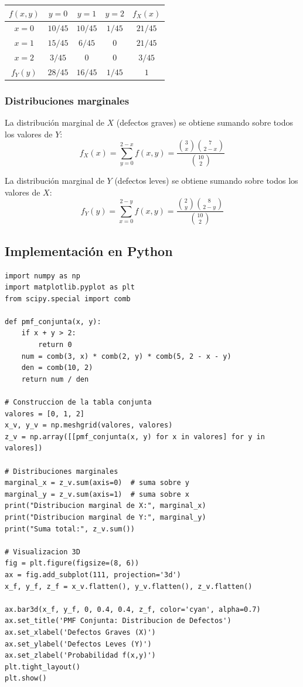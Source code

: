 \documentclass[12pt,a4paper]{article}
\begin{document}
\begin{center}
\renewcommand{\arraystretch}{1.4}
\begin{tabular}{c|ccc|c}
\toprule
$f(x,y)$ & $y=0$ & $y=1$ & $y=2$ & $f_X(x)$ \\
\midrule
$x=0$ & $10/45$ & $10/45$ & $1/45$ & $21/45$ \\
$x=1$ & $15/45$ & $6/45$  & $0$    & $21/45$ \\
$x=2$ & $3/45$  & $0$     & $0$    & $3/45$  \\
\midrule
$f_Y(y)$ & $28/45$ & $16/45$ & $1/45$ & $1$ \\
\bottomrule
\end{tabular}
\end{center}
 
\subsubsection*{Distribuciones marginales}
 
La distribución marginal de $X$ (defectos graves) se obtiene sumando sobre todos los valores de $Y$:
\[
f_X(x) = \sum_{y=0}^{2-x} f(x,y) = \frac{\binom{3}{x}\binom{7}{2-x}}{\binom{10}{2}}
\]
 
La distribución marginal de $Y$ (defectos leves) se obtiene sumando sobre todos los valores de $X$:
\[
f_Y(y) = \sum_{x=0}^{2-y} f(x,y) = \frac{\binom{2}{y}\binom{8}{2-y}}{\binom{10}{2}}
\]
 
\subsection{Implementación en Python}
 
\begin{lstlisting}
import numpy as np
import matplotlib.pyplot as plt
from scipy.special import comb
 
def pmf_conjunta(x, y):
    if x + y > 2:
        return 0
    num = comb(3, x) * comb(2, y) * comb(5, 2 - x - y)
    den = comb(10, 2)
    return num / den
 
# Construccion de la tabla conjunta
valores = [0, 1, 2]
x_v, y_v = np.meshgrid(valores, valores)
z_v = np.array([[pmf_conjunta(x, y) for x in valores] for y in valores])
 
# Distribuciones marginales
marginal_x = z_v.sum(axis=0)  # suma sobre y
marginal_y = z_v.sum(axis=1)  # suma sobre x
print("Distribucion marginal de X:", marginal_x)
print("Distribucion marginal de Y:", marginal_y)
print("Suma total:", z_v.sum())
 
# Visualizacion 3D
fig = plt.figure(figsize=(8, 6))
ax = fig.add_subplot(111, projection='3d')
x_f, y_f, z_f = x_v.flatten(), y_v.flatten(), z_v.flatten()
 
ax.bar3d(x_f, y_f, 0, 0.4, 0.4, z_f, color='cyan', alpha=0.7)
ax.set_title('PMF Conjunta: Distribucion de Defectos')
ax.set_xlabel('Defectos Graves (X)')
ax.set_ylabel('Defectos Leves (Y)')
ax.set_zlabel('Probabilidad f(x,y)')
plt.tight_layout()
plt.show()
\end{lstlisting}
 
\end{document}
